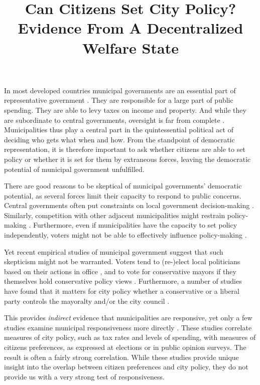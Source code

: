 \documentclass[a4paper,12pt]{article}
\title{\bigskip \bigskip \sffamily \LARGE{Can Citizens Set City Policy?} \\ \Large{ Evidence From A Decentralized Welfare State}}
\begin{document}
\noindent In most developed countries municipal governments are an essential part of representative government \citep{trounstine2009all,kersting2013reforming}. They are responsible for a large part of public spending.  They are able to levy taxes on income and property. And while they are subordinate to central governments, oversight is far from complete \citep{oecd2016subnational}. Municipalities thus play a central part in the quintessential political act of deciding who gets what when and how. From the standpoint of democratic representation, it is therefore important to ask whether citizens are able to set policy or whether it is set for them by extraneous forces, leaving the democratic potential of municipal government unfulfilled.


There are good reasons to be skeptical of municipal governments' democratic potential, as several forces limit their capacity to respond to public concerns. Central governments often put constraints on local government decision-making \citep{peterson1981city}. Similarly, competition with other adjacent municipalities might restrain policy-making \citep{salmon2006horizontal}. Furthermore, even if municipalities have the capacity to set policy independently, voters might not be able to effectively influence policy-making \citep[e.g.,][]{gerber2011mayors}. 


Yet recent empirical studies of municipal government suggest that such skepticism might not be warranted. Voters tend to (re-)elect local politicians based on their actions in office \citep[e.g.,][]{boyne2009democracy,larsen2018relationship}, and to vote for conservative  mayors if they themselves hold conservative policy views  \citep{sances2017ideology,boudreau2015lost,hopkins2017retrospective}. Furthermore, a number of studies have found that it matters for city policy whether a conservative or a liberal party controls the mayoralty and/or the city council \citep[e.g.,][]{fiva2016power,blom2006parties,de2016mayoral}.  

This provides \textit{indirect} evidence that municipalities are responsive, yet only a few studies examine municipal responsiveness more directly \citep{tausanovitch2014representation,hajnal2010or,palus2010responsiveness,einstein2016pushing}. These studies correlate measures of city policy, such as tax rates and levels of spending, with measures of citizens preferences, as expressed at elections or in public opinion surveys. The result is often a fairly strong correlation. While these studies provide unique insight into the overlap between citizen preferences and city policy, they do not provide us with a very strong test of responsiveness. 
\end{document}

